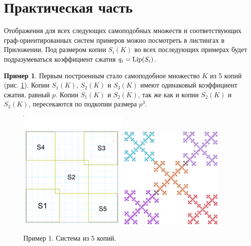 \documentclass[a4paper,14pt]{extarticle} %
\newcommand{\0}{\varnothing}
\newcommand{\8}{\infty}
\def \Lip  {\mathop{\rm Lip}  \nolimits}
\theoremstyle{definition}
\newtheorem{example}{Пример}
\begin{document}
\newpage
\section{Практическая часть}

Отображения для всех следующих самоподобных множеств и соответствующих граф-ориентированных систем примеров можно посмотреть в листингах в Приложении.
Под размером копии $S_i(K)$ во всех последующих примерах будет подразумеваться коэффициент сжатия $q_i=\Lip(S_i)$.

\begin{example}\label{ex:1}
Первым построенным стало самоподобное множество $K$ из 5 копий (рис. \ref{fig:primer1_skelet}). 
Копии $S_1(K)$, $S_2(K)$ и $S_3(K)$ имеют одинаковый коэффициент сжатия, равный $p$.
Копии $S_1(K)$ и $S_2(K)$, так же как и копии $S_2(K)$ и $S_3(K)$, пересекаются по подкопии размера $p^3$. 

\begin{figure}[H]
    \centering
    \includegraphics[width=0.48\textwidth]{3_2_скелет.png}
    \hfill
    \includegraphics[width=0.45\textwidth]{3_2.png}
    \caption{Пример 1. Система из 5 копий.}
    \label{fig:primer1_skelet}
\end{figure}


\end{example}
\end{document}
